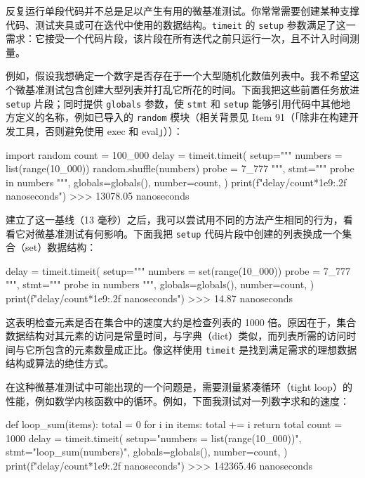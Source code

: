 反复运行单段代码并不总是足以产生有用的微基准测试。你常常需要创建某种支撑代码、测试夹具或可在迭代中使用的数据结构。\texttt{timeit} 的 \texttt{setup} 参数满足了这一需求：它接受一个代码片段，该片段在所有迭代之前只运行一次，且不计入时间测量。

例如，假设我想确定一个数字是否存在于一个大型随机化数值列表中。我不希望这个微基准测试包含创建大型列表并打乱它所花的时间。下面我把这些前置任务放进 \texttt{setup} 片段；同时提供 \texttt{globals} 参数，使 \texttt{stmt} 和 \texttt{setup} 能够引用代码中其他地方定义的名称，例如已导入的 \texttt{random} 模块（相关背景见 Item 91（「除非在构建开发工具，否则避免使用 exec 和 eval」））：

\begin{codebox}[python]
import random
count = 100_000
delay = timeit.timeit(
    setup="""
numbers = list(range(10_000))
random.shuffle(numbers)
probe = 7_777
""",
    stmt="""
probe in numbers
""",
    globals=globals(),
    number=count,
)
print(f"{delay/count*1e9:.2f} nanoseconds")
>>>
13078.05 nanoseconds
\end{codebox}

建立了这一基线（13 毫秒）之后，我可以尝试用不同的方法产生相同的行为，看看它对微基准测试有何影响。下面我把 \texttt{setup} 代码片段中创建的列表换成一个集合（set）数据结构：

\begin{codebox}[python]
delay = timeit.timeit(
    setup="""
numbers = set(range(10_000))
probe = 7_777
""",
    stmt="""
probe in numbers
""",
    globals=globals(),
    number=count,
)
print(f"{delay/count*1e9:.2f} nanoseconds")
>>>
14.87 nanoseconds
\end{codebox}

这表明检查元素是否在集合中的速度大约是检查列表的 1000 倍。原因在于，集合数据结构对其元素的访问是常量时间，与字典（dict）类似，而列表所需的访问时间与它所包含的元素数量成正比。像这样使用 \texttt{timeit} 是找到满足需求的理想数据结构或算法的绝佳方式。

在这种微基准测试中可能出现的一个问题是，需要测量紧凑循环（tight loop）的性能，例如数学内核函数中的循环。例如，下面我测试对一列数字求和的速度：

\begin{codebox}[python]
def loop_sum(items):
    total = 0
    for i in items:
        total += i
    return total
count = 1000
delay = timeit.timeit(
    setup="numbers = list(range(10_000))",
    stmt="loop_sum(numbers)",
    globals=globals(),
    number=count,
)
print(f"{delay/count*1e9:.2f} nanoseconds")
>>>
142365.46 nanoseconds
\end{codebox}

